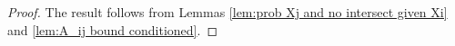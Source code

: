 \begin{proof}
		The result follows from Lemmas \ref{lem:prob Xj and no intersect given Xi} and \ref{lem:A_ij bound conditioned}.
	\end{proof}

